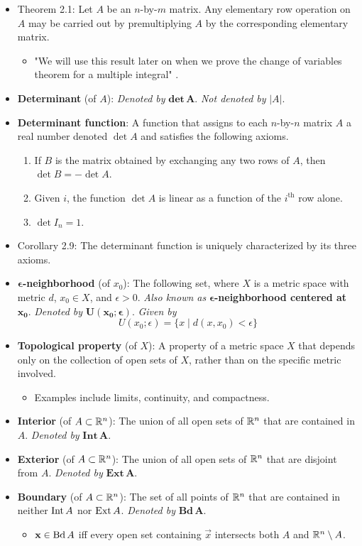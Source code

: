 \documentclass[../notes.tex]{subfiles}
\begin{document}
\begin{itemize}
    \item Theorem 2.1: Let $A$ be an $n$-by-$m$ matrix. Any elementary row operation on $A$ may be carried out by premultiplying $A$ by the corresponding elementary matrix.
    \begin{itemize}
        \item "We will use this result later on when we prove the change of variables theorem for a multiple integral" \parencite[12]{bib:Munkres}.
    \end{itemize}
    \item \textbf{Determinant} (of $A$): \emph{Denoted by} $\textbf{det}\,\bm{A}$. \emph{Not denoted by} $|A|$.
    \item \textbf{Determinant function}: A function that assigns to each $n$-by-$n$ matrix $A$ a real number denoted $\det A$ and satisfies the following axioms.
    \begin{enumerate}
        \item If $B$ is the matrix obtained by exchanging any two rows of $A$, then $\det B=-\det A$.
        \item Given $i$, the function $\det A$ is linear as a function of the $i^\text{th}$ row alone.
        \item $\det I_n=1$.
    \end{enumerate}
    \item Corollary 2.9: The determinant function is uniquely characterized by its three axioms.
    \item \textbf{$\bm{\epsilon}$-neighborhood} (of $x_0$): The following set, where $X$ is a metric space with metric $d$, $x_0\in X$, and $\epsilon>0$. \emph{Also known as} \textbf{$\bm{\epsilon}$-neighborhood centered at $\bm{x_0}$}. \emph{Denoted by} $\bm{U(x_0;\epsilon)}$. \emph{Given by}
    \begin{equation*}
        U(x_0;\epsilon) = \{x\mid d(x,x_0)<\epsilon\}
    \end{equation*}
    \item \textbf{Topological property} (of $X$): A property of a metric space $X$ that depends only on the collection of open sets of $X$, rather than on the specific metric involved.
    \begin{itemize}
        \item Examples include limits, continuity, and compactness.
    \end{itemize}
    \item \textbf{Interior} (of $A\subset\mathbb{R}^n$): The union of all open sets of $\mathbb{R}^n$ that are contained in $A$. \emph{Denoted by} $\textbf{Int}\,\bm{A}$.
    \item \textbf{Exterior} (of $A\subset\mathbb{R}^n$): The union of all open sets of $\mathbb{R}^n$ that are disjoint from $A$. \emph{Denoted by} $\textbf{Ext}\,\bm{A}$.
    \item \textbf{Boundary} (of $A\subset\mathbb{R}^n$): The set of all points of $\mathbb{R}^n$ that are contained in neither $\operatorname{Int} A$ nor $\operatorname{Ext} A$. \emph{Denoted by} $\textbf{Bd}\,\bm{A}$.
    \begin{itemize}
        \item $\mathbf{x}\in\operatorname{Bd} A$ iff every open set containing $\vec{x}$ intersects both $A$ and $\mathbb{R}^n\setminus A$.
    \end{itemize}
\end{itemize}
\end{document}
